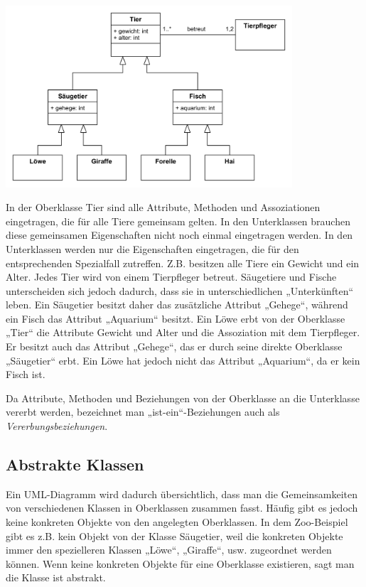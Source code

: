 \begin{center}
\includegraphics[width=0.8\textwidth]{./inf/SEKII/15_UML_Klassendiagramme/Zoo.png}
\end{center}

In der Oberklasse Tier sind alle Attribute, Methoden und Assoziationen
eingetragen, die für alle Tiere gemeinsam gelten. In den Unterklassen brauchen
diese gemeinsamen Eigenschaften nicht noch einmal eingetragen werden. In den
Unterklassen werden nur die Eigenschaften eingetragen, die für den
entsprechenden Spezialfall zutreffen. Z.B. besitzen alle Tiere ein Gewicht und
ein Alter. Jedes Tier wird von einem Tierpfleger betreut. Säugetiere und Fische
unterscheiden sich jedoch dadurch, dass sie in unterschiedlichen „Unterkünften“
leben. Ein Säugetier besitzt daher das zusätzliche Attribut „Gehege“, während
ein Fisch das Attribut „Aquarium“ besitzt. Ein Löwe erbt von der Oberklasse
„Tier“ die Attribute Gewicht und Alter und die Assoziation mit dem Tierpfleger.
Er besitzt auch das Attribut „Gehege“, das er durch seine direkte Oberklasse
„Säugetier“ erbt. Ein Löwe hat jedoch nicht das Attribut „Aquarium“, da er kein
Fisch ist.

Da Attribute, Methoden und Beziehungen von der Oberklasse an die Unterklasse
vererbt werden, bezeichnet man „ist-ein“-Beziehungen auch als
\emph{Vererbungsbeziehungen}.


\subsection{Abstrakte Klassen}

Ein UML-Diagramm wird dadurch übersichtlich, dass man die Gemeinsamkeiten von
verschiedenen Klassen in Oberklassen zusammen fasst. Häufig gibt es jedoch
keine konkreten Objekte von den angelegten Oberklassen. In dem Zoo-Beispiel
gibt es z.B. kein Objekt von der Klasse Säugetier, weil die konkreten Objekte
immer den spezielleren Klassen „Löwe“, „Giraffe“, usw. zugeordnet werden
können. Wenn keine konkreten Objekte für eine Oberklasse existieren, sagt man
die Klasse ist abstrakt.